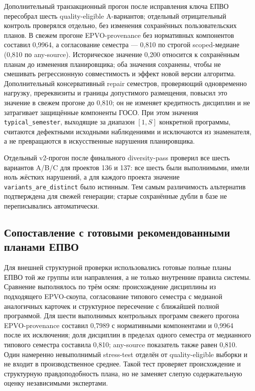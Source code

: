 \documentclass[twoside,11pt]{article}
\begin{document}
Дополнительный транзакционный прогон после исправления ключа ЕПВО пересобрал шесть
quality-eligible A-вариантов; отдельный отрицательный контроль проверялся отдельно,
без изменения сохранённых пользовательских планов. В свежем прогоне
EPVO-provenance без нормативных компонентов составил 0,9964, а согласование семестра
— 0,810 по строгой scoped-медиане (0,810 по any-source). Историческое значение 0,200 относится к сохранённым планам до изменения
планировщика; оба значения сохранены, чтобы не смешивать регрессионную совместимость
и эффект новой версии алгоритма.
Дополнительный консервативный repair семестров, проверяющий одновременно нагрузку,
пререквизиты и границы допустимого размещения, повысил это значение в свежем прогоне
до 0,810; он не изменяет кредитность дисциплин и не затрагивает защищённые компоненты ГОСО.
При этом значения \texttt{typical\_semester}, выходящие за диапазон $[1,S]$ конкретной
программы, считаются дефектными исходными наблюдениями и исключаются из знаменателя,
а не превращаются в искусственные нарушения планировщика.

Отдельный v2-прогон после финального diversity-pass проверил все шесть вариантов
A/B/C для проектов 136 и 137: все шесть были выполнимыми, имели ноль жёстких
нарушений, а для каждого проекта значение \texttt{variants\_are\_distinct} было
истинным. Тем самым различимость альтернатив подтверждена для свежей генерации;
старые сохранённые дубли в базе не переписывались автоматически.

  \subsection{Сопоставление с готовыми рекомендованными планами ЕПВО}

Для внешней структурной проверки использовались готовые полные планы ЕПВО той же
группы или направления, а не только внутренние правила системы. Сравнение выполнялось
по трём осям: происхождение дисциплины из подходящего EPVO-скоупа, согласование типового
семестра с медианой аналогичных карточек и структурное пересечение с ближайшей полной
программой. Для шести выполнимых контрольных программ свежего прогона EPVO-provenance составил 0,7989 с нормативными компонентами и 0,9964 после их исключения; доля
дисциплин в пределах одного семестра от медианного типового семестра составила 0,810; any-source показатель также равен 0,810.
Один намеренно невыполнимый stress-test отделён от quality-eligible выборки и не входит
в производственное среднее. Такой тест проверяет происхождение и структурную правдоподобность
плана, но не заменяет слепую содержательную оценку независимыми экспертами.
\end{document}
